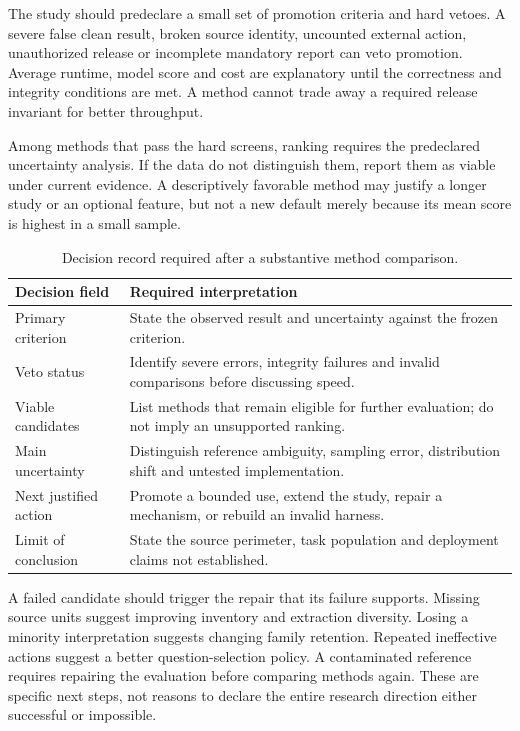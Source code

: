 The study should predeclare a small set of promotion criteria and hard vetoes.
A severe false clean result, broken source identity, uncounted external action,
unauthorized release or incomplete mandatory report can veto promotion. Average
runtime, model score and cost are explanatory until the correctness and integrity
conditions are met. A method cannot trade away a required release invariant for
better throughput.

Among methods that pass the hard screens, ranking requires the predeclared
uncertainty analysis. If the data do not distinguish them, report them as viable
under current evidence. A descriptively favorable method may justify a longer
study or an optional feature, but not a new default merely because its mean score
is highest in a small sample.

\begin{table}[htbp]
\centering\small
\caption{Decision record required after a substantive method comparison.}
\begin{tabularx}{\textwidth}{P{39mm}Y}
\toprule
Decision field & Required interpretation\\\midrule
Primary criterion & State the observed result and uncertainty against the frozen criterion.\\
Veto status & Identify severe errors, integrity failures and invalid comparisons before discussing speed.\\
Viable candidates & List methods that remain eligible for further evaluation; do not imply an unsupported ranking.\\
Main uncertainty & Distinguish reference ambiguity, sampling error, distribution shift and untested implementation.\\
Next justified action & Promote a bounded use, extend the study, repair a mechanism, or rebuild an invalid harness.\\
Limit of conclusion & State the source perimeter, task population and deployment claims not established.\\
\bottomrule
\end{tabularx}
\end{table}

A failed candidate should trigger the repair that its failure supports. Missing
source units suggest improving inventory and extraction diversity. Losing a
minority interpretation suggests changing family retention. Repeated ineffective
actions suggest a better question-selection policy. A contaminated reference
requires repairing the evaluation before comparing methods again. These are
specific next steps, not reasons to declare the entire research direction either
successful or impossible.

